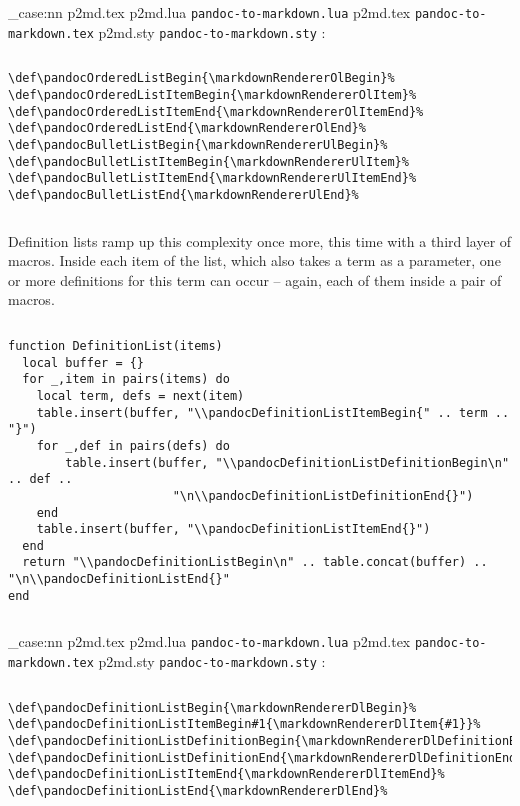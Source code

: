 \documentclass[
  digital,     %
  oneside,     %
  nosansbold,  %
  nocolorbold, %
  lof,         %
  nolot,       %
]{fithesis4}
\newcommand\file[1]
  {
    \str_case:nn
      { #1 }
      {
        { p2md.lua } { \texttt{pandoc\hyp{}to\hyp{}markdown.lua} }
        { p2md.tex } { \texttt{pandoc\hyp{}to\hyp{}markdown.tex} }
        { p2md.sty } { \texttt{pandoc\hyp{}to\hyp{}markdown.sty} }
      }
  }
\begin{document}
$ $

\noindent
\file{p2md.tex}:

$ $

\noindent
\lstset{language=[plain]TeX}
\begin{lstlisting}
\def\pandocOrderedListBegin{\markdownRendererOlBegin}%
\def\pandocOrderedListItemBegin{\markdownRendererOlItem}%
\def\pandocOrderedListItemEnd{\markdownRendererOlItemEnd}%
\def\pandocOrderedListEnd{\markdownRendererOlEnd}%
\def\pandocBulletListBegin{\markdownRendererUlBegin}%
\def\pandocBulletListItemBegin{\markdownRendererUlItem}%
\def\pandocBulletListItemEnd{\markdownRendererUlItemEnd}%
\def\pandocBulletListEnd{\markdownRendererUlEnd}%
\end{lstlisting}

$ $

\noindent
Definition lists ramp up this complexity once more, this time with a third layer of macros. Inside  each item of the list, which also takes a term as a parameter, one or more definitions for this term can occur -- again, each of them inside a pair of macros.

$ $

\noindent
\lstset{language=[5.3]Lua}
\begin{lstlisting}
function DefinitionList(items)
  local buffer = {}
  for _,item in pairs(items) do
    local term, defs = next(item)
    table.insert(buffer, "\\pandocDefinitionListItemBegin{" .. term .. "}")
    for _,def in pairs(defs) do
        table.insert(buffer, "\\pandocDefinitionListDefinitionBegin\n" .. def ..
                       "\n\\pandocDefinitionListDefinitionEnd{}")
    end
    table.insert(buffer, "\\pandocDefinitionListItemEnd{}")
  end
  return "\\pandocDefinitionListBegin\n" .. table.concat(buffer) .. "\n\\pandocDefinitionListEnd{}"
end
\end{lstlisting}

$ $

\noindent
\file{p2md.tex}:

$ $

\noindent
\lstset{language=[plain]TeX}
\begin{lstlisting}
\def\pandocDefinitionListBegin{\markdownRendererDlBegin}%
\def\pandocDefinitionListItemBegin#1{\markdownRendererDlItem{#1}}%
\def\pandocDefinitionListDefinitionBegin{\markdownRendererDlDefinitionBegin}%
\def\pandocDefinitionListDefinitionEnd{\markdownRendererDlDefinitionEnd}%
\def\pandocDefinitionListItemEnd{\markdownRendererDlItemEnd}%
\def\pandocDefinitionListEnd{\markdownRendererDlEnd}%
\end{lstlisting}
\end{document}
